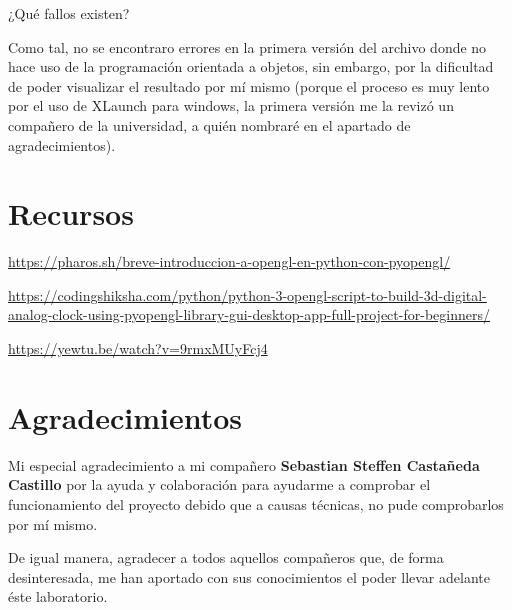 \begin{myquote}
¿Qué fallos existen?
\end{myquote}

Como tal, no se encontraro errores en la primera versión del archivo donde no hace uso de la programación orientada a objetos, sin embargo, por la dificultad de poder visualizar el resultado por mí mismo (porque el proceso es muy lento por el uso de XLaunch para windows, la primera versión me la revizó un compañero de la universidad, a quién nombraré en el apartado de agradecimientos).

\chapter{Recursos}
\href{https://pharos.sh/breve-introduccion-a-opengl-en-python-con-pyopengl/}{https://pharos.sh/breve-introduccion-a-opengl-en-python-con-pyopengl/}

\href{https://codingshiksha.com/python/python-3-opengl-script-to-build-3d-digital-analog-clock-using-pyopengl-library-gui-desktop-app-full-project-for-beginners/}{https://codingshiksha.com/python/python-3-opengl-script-to-build-3d-digital-analog-clock-using-pyopengl-library-gui-desktop-app-full-project-for-beginners/}

\href{https://yewtu.be/watch?v=9rmxMUyFcj4}{https://yewtu.be/watch?v=9rmxMUyFcj4}



\chapter{Agradecimientos}
Mi especial agradecimiento a mi compañero \textbf{Sebastian Steffen Castañeda Castillo} por la ayuda y colaboración para ayudarme a comprobar el funcionamiento del proyecto debido que a causas técnicas, no pude comprobarlos por mí mismo.

De igual manera, agradecer a todos aquellos compañeros que, de forma desinteresada, me han aportado con sus conocimientos el poder llevar adelante éste laboratorio.



